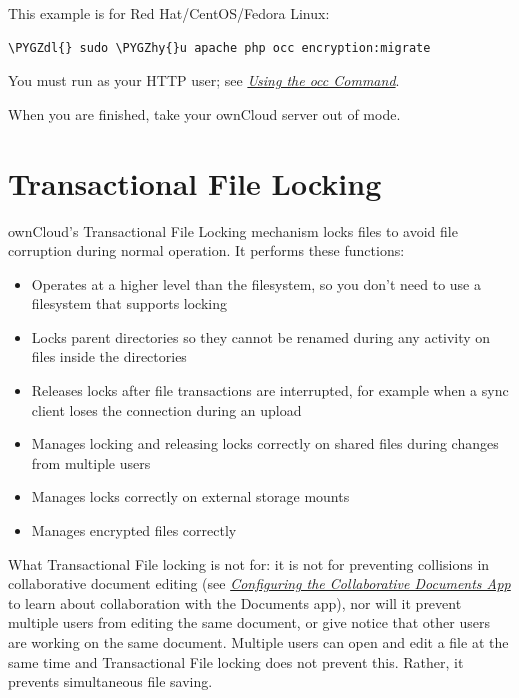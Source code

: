 \documentclass[letterpaper,10pt,english]{sphinxmanual}
\def\PYGZdl{\char`\$}
\def\PYGZhy{\char`\-}
\begin{document}
This example is for Red Hat/CentOS/Fedora Linux:

\begin{Verbatim}[commandchars=\\\{\}]
\PYGZdl{} sudo \PYGZhy{}u apache php occ encryption:migrate
\end{Verbatim}

You must run  as your HTTP user; see
{\hyperref[configuration_server/occ_command::doc]{\emph{\emph{Using the occ Command}}}}.

When you are finished, take your ownCloud server out of
 mode.


\section{Transactional File Locking}
\label{configuration_files/files_locking_transactional:transactional-file-locking}\label{configuration_files/files_locking_transactional::doc}
ownCloud's Transactional File Locking mechanism locks files to avoid
file corruption during normal operation. It performs these functions:
\begin{itemize}
\item {} 
Operates at a higher level than the filesystem, so you don't need to use a
filesystem that supports locking

\item {} 
Locks parent directories so they cannot be renamed during any activity on
files inside the directories

\item {} 
Releases locks after file transactions are interrupted, for
example when a sync client loses the connection during an upload

\item {} 
Manages locking and releasing locks correctly on shared files during changes
from multiple users

\item {} 
Manages locks correctly on external storage mounts

\item {} 
Manages encrypted files correctly

\end{itemize}

What Transactional File locking is not for: it is not for preventing collisions
in collaborative document editing (see
{\hyperref[configuration_files/collaborative_documents_configuration::doc]{\emph{\emph{Configuring the Collaborative Documents App}}}} to learn about collaboration with
the Documents app), nor will it prevent multiple users from editing the same
document, or give notice that other users are working on the same document.
Multiple users can open and edit a file at the same time and Transactional File
locking does not prevent this. Rather, it prevents simultaneous file saving.
\end{document}
